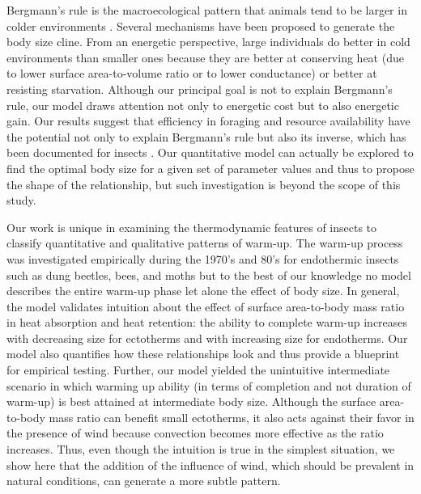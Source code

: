 Bergmann's rule is the macroecological pattern that animals tend to be larger in colder environments \citep{Bergmann1847,Blackburn1999}. %
Several mechanisms have been proposed to generate the body size cline.
From an energetic perspective, large individuals do better in cold environments than smaller ones because they are better at conserving heat (due to lower surface area-to-volume ratio or to lower conductance) or better at resisting starvation. 
Although our principal goal is not to explain Bergmann's rule, our model draws attention not only to energetic cost but to also energetic gain.
Our results suggest that efficiency in foraging and resource availability have the potential not only to explain Bergmann's rule but also its inverse, which has been documented for insects \citep{Cushman1993, Loder1997,Blackburn1999}. %
Our quantitative model can actually be explored to find the optimal body size for a given set of parameter values and thus to propose the shape of the relationship, but such investigation is beyond the scope of this study.

Our work is unique in examining the thermodynamic features of insects to classify quantitative and qualitative patterns of warm-up.
The warm-up process was investigated empirically during the 1970's and 80's for endothermic insects  such as dung beetles, bees, and moths \citep{Heinrich1975, Bartholomew1978, Bartholomew1981} but to the best of our knowledge no model describes the entire warm-up phase let alone the effect of body size.
In general, the model validates intuition about  the effect of surface area-to-body mass ratio in heat absorption and heat retention: the ability to complete warm-up increases with decreasing size for ectotherms and with increasing size for endotherms.
Our model also quantifies how these relationships look and thus provide a blueprint for empirical testing.
Further, our model yielded the unintuitive intermediate scenario in which warming up ability (in terms of completion and not duration of warm-up) is best attained at intermediate body size. 
Although the surface area-to-body mass ratio can benefit small ectotherms, it also acts against their favor in the presence of wind because convection becomes more effective as the ratio increases.
Thus, even though the intuition is true in the simplest situation, we show here that the addition of the influence of wind, which should be prevalent in natural conditions, can generate a more subtle pattern.


